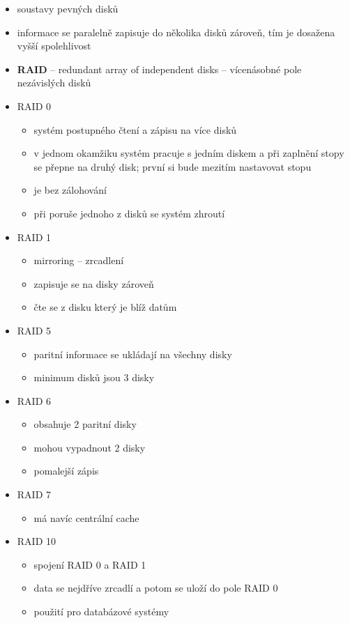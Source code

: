 \documentclass[a4paper,12pt]{article}
\providecommand{\tightlist}{%
\setlength{\itemsep}{0pt}\setlength{\parskip}{0pt}}
\begin{document}
\begin{itemize}
\tightlist
\item soustavy pevných disků
\item informace se paralelně zapisuje do několika disků zároveň, tím je
  dosažena vyšší spolehlivost
\item \textbf{RAID} -- redundant array of independent disks -- vícenásobné
  pole nezávislých disků
\item RAID 0

  \begin{itemize}
  \tightlist
  \item systém postupného čtení a zápisu na více disků
  \item v jednom okamžiku systém pracuje s jedním diskem a při zaplnění
    stopy se přepne na druhý disk; první si bude mezitím nastavovat
    stopu
  \item je bez zálohování
  \item při poruše jednoho z disků se systém zhroutí
  \end{itemize}
\item RAID 1

  \begin{itemize}
  \tightlist
  \item mirroring -- zrcadlení
  \item zapisuje se na disky zároveň
  \item čte se z disku který je blíž datům
  \end{itemize}
\item RAID 5

  \begin{itemize}
  \tightlist
  \item paritní informace se ukládají na všechny disky
  \item minimum disků jsou 3 disky
  \end{itemize}
\item RAID 6

  \begin{itemize}
  \tightlist
  \item obsahuje 2 paritní disky
  \item mohou vypadnout 2 disky
  \item pomalejší zápis
  \end{itemize}
\item RAID 7

  \begin{itemize}
  \tightlist
  \item má navíc centrální cache
  \end{itemize}
\item RAID 10

  \begin{itemize}
  \tightlist
  \item spojení RAID 0 a RAID 1
  \item data se nejdříve zrcadlí a potom se uloží do pole RAID 0
  \item použití pro databázové systémy
  \end{itemize}
\end{itemize}
\end{document}
